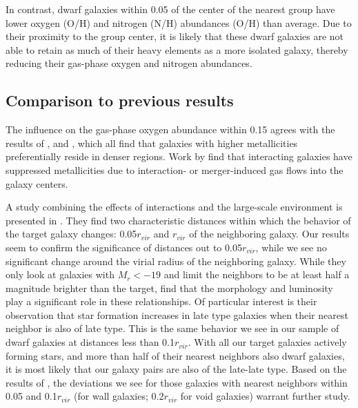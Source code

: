 In contrast, dwarf galaxies within 0.05 \hMpc of the center of the nearest group 
have lower oxygen (O/H) and nitrogen (N/H) abundances (O/H) than average.  Due 
to their proximity to the group center, it is likely that these dwarf galaxies 
are not able to retain as much of their heavy elements as a more isolated 
galaxy, thereby reducing their gas-phase oxygen and nitrogen abundances.


\subsection{Comparison to previous results}

The influence on the gas-phase oxygen abundance within 0.15 \hMpc agrees with 
the results of \cite{Shields91,Pustilnik06,Cooper08,Ellison09,Pustilnik11a,
Pustilnik14}, and \cite{SanchezAlmeida16}, which all find that galaxies with 
higher metallicities preferentially reside in denser regions.  Work by 
\cite{Rupke08} find that interacting galaxies have suppressed metallicities due 
to interaction- or merger-induced gas flows into the galaxy centers.

A study combining the effects of interactions and the large-scale environment is 
presented in \cite{Park09}.  They find two characteristic distances within which 
the behavior of the target galaxy changes: 0.05$r_{vir}$ and $r_{vir}$ of the 
neighboring galaxy.  Our results seem to confirm the significance of distances 
out to 0.05$r_{vir}$, while we see no significant change around the virial 
radius of the neighboring galaxy.  While they only look at galaxies with 
$M_r < -19$ and limit the neighbors to be at least half a magnitude brighter 
than the target, \cite{Park09} find that the morphology and luminosity play a 
significant role in these relationships.  Of particular interest is their 
observation that star formation increases in late type galaxies when their 
nearest neighbor is also of late type.  This is the same behavior we see in our 
sample of dwarf galaxies at distances less than 0.1$r_{vir}$.  With all our 
target galaxies actively forming stars, and more than half of their nearest 
neighbors also dwarf galaxies, it is most likely that our galaxy pairs are also 
of the late-late type.  Based on the results of \cite{Park09}, the deviations we 
see for those galaxies with nearest neighbors within 0.05 \hMpc and 
0.1$r_{vir}$ (for wall galaxies; 0.2$r_{vir}$ for void galaxies) warrant further 
study.




